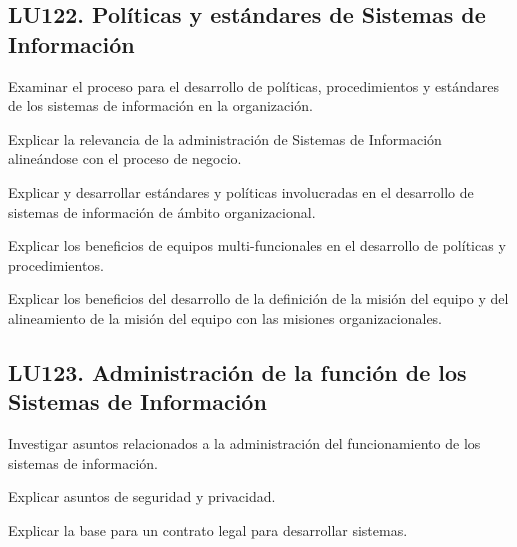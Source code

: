 \subsection{LU122. Políticas y estándares de Sistemas de Información}\label{sec:LU122}
\begin{LearningUnit}
\begin{LUGoal}
\item Examinar el proceso para el desarrollo de políticas, procedimientos y estándares de los sistemas de información en la organización.
\end{LUGoal}

\begin{LUObjective}
\item Explicar la relevancia de la administración de Sistemas de Información alineándose con el proceso de negocio.
\item Explicar y desarrollar estándares y políticas involucradas en el desarrollo de sistemas de información de ámbito organizacional.
\item Explicar los beneficios de equipos multi-funcionales en el desarrollo de políticas y procedimientos.
\item Explicar los beneficios del desarrollo de la definición de la misión del equipo y del alineamiento de la misión del equipo con las misiones organizacionales.
\end{LUObjective}
\end{LearningUnit}

\subsection{LU123. Administración de la función de los Sistemas de Información}\label{sec:LU123}
\begin{LearningUnit}
\begin{LUGoal}
\item Investigar asuntos relacionados a la administración del funcionamiento de los sistemas de información.
\end{LUGoal}

\begin{LUObjective}
\item Explicar asuntos de seguridad y privacidad.
\item Explicar la base para un contrato legal para desarrollar sistemas.
\end{LUObjective}
\end{LearningUnit}


